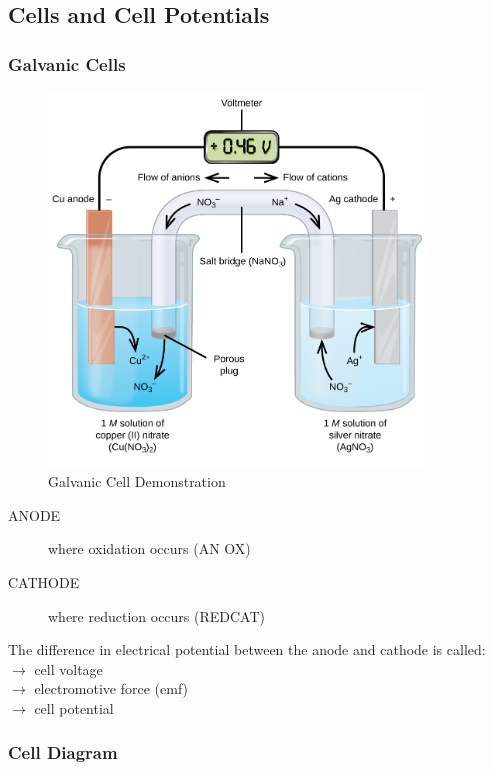 \documentclass[11pt]{article}
\begin{document}
    \subsection{Cells and Cell Potentials}
    \subsubsection{Galvanic Cells}

    \begin{figure}[h]
        \begin{center}
            \includegraphics[width=10cm]{galvanic_cell}
            \caption{Galvanic Cell Demonstration}
        \end{center}
    \end{figure}

    \begin{description}
        \item[ANODE] where oxidation occurs (AN OX)
        \item[CATHODE] where reduction occurs (REDCAT)
    \end{description}

    The difference in electrical potential between the anode and cathode is called: \\
    $\rightarrow$ cell voltage \\
    $\rightarrow$ electromotive force (emf) \\
    $\rightarrow$ cell potential

    \subsubsection{Cell Diagram}
\end{document}
